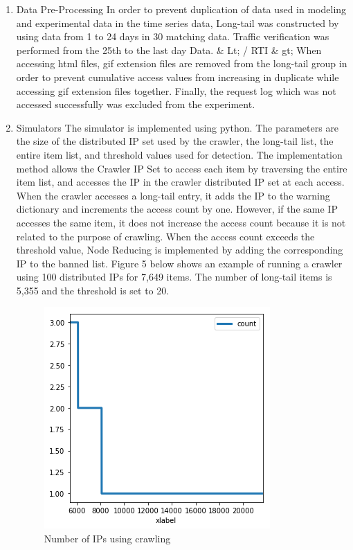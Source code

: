 \begin{enumerate}
\item Data Pre-Processing
\newline In order to prevent duplication of data used in modeling and experimental data in the time series data, Long-tail was constructed by using data from 1 to 24 days in 30 matching data. Traffic verification was performed from the 25th to the last day Data. \& Lt; / RTI \& gt;
When accessing html files, gif extension files are removed from the long-tail group in order to prevent cumulative access values from increasing in duplicate while accessing gif extension files together.
Finally, the request log which was not accessed successfully was excluded from the experiment.
\newline
\item Simulators
\newline 
The simulator is implemented using python. The parameters are the size of the distributed IP set used by the crawler, the long-tail list, the entire item list, and threshold values used for detection.
The implementation method allows the Crawler IP Set to access each item by traversing the entire item list, and accesses the IP in the crawler distributed IP set at each access.
When the crawler accesses a long-tail entry, it adds the IP to the warning dictionary and increments the access count by one. However, if the same IP accesses the same item, it does not increase the access count because it is not related to the purpose of crawling. When the access count exceeds the threshold value, Node Reducing is implemented by adding the corresponding IP to the banned list. Figure 5 below shows an example of running a crawler using 100 distributed IPs for 7,649 items. The number of long-tail items is 5,355 and the threshold is set to 20. 

\begin{figure}[H]
    \includegraphics[width=0.65\columnwidth]{figs/figure_05_td4.png}
    \caption{Number of IPs using crawling}
    \label{fig:my_label}
\end{figure}


\end{enumerate}
